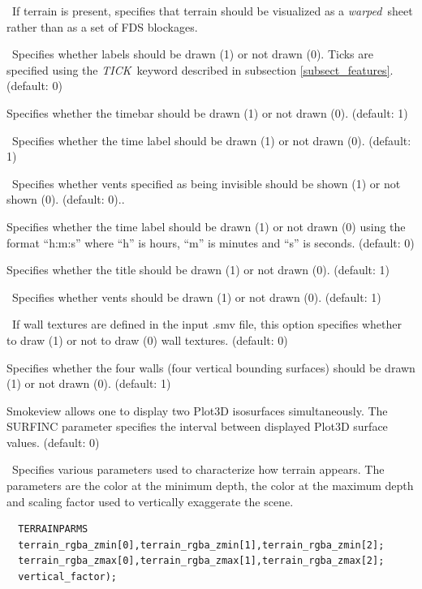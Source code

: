 \documentclass[11pt,twoside]{book}
\begin{document}
\ If terrain is present, specifies that terrain
should be visualized as a {\em warped}\ sheet
rather than as a set of FDS blockages.

\ Specifies whether labels should be drawn (1) or
not drawn (0).  Ticks are specified using the {\em TICK}\ keyword
described in subsection \ref{subsect_features}. (default: 0)

Specifies whether the timebar should be drawn
(1) or not drawn (0). (default: 1)

\ Specifies whether the time label should be
drawn (1) or not drawn (0). (default: 1)

\ Specifies whether vents specified as being invisible should be
shown (1) or not shown (0). (default: 0)..

Specifies whether the time label should be
drawn (1) or not drawn (0) using the format ``h:m:s'' where ``h''
is hours, ``m'' is minutes and ``s'' is seconds.  (default: 0)

Specifies whether
the title should be drawn (1) or not drawn (0).
(default: 1)

\ Specifies whether vents should be drawn
(1) or not drawn (0).  (default: 1)

\ If wall textures are defined in the input .smv file, this
option specifies whether to draw (1) or not to draw (0) wall textures.
(default: 0)


Specifies whether
the four walls (four vertical bounding surfaces) should be drawn (1) or not drawn (0).
(default: 1)

Smokeview allows one to display two Plot3D
isosurfaces simultaneously.  The SURFINC parameter specifies the
interval between displayed Plot3D surface values. (default: 0)

\ Specifies various parameters used to characterize
how terrain appears.  The parameters are the color at the minimum depth,
the color at the maximum depth and scaling factor used to vertically exaggerate
the scene.
\begin{lstlisting}
  TERRAINPARMS
  terrain_rgba_zmin[0],terrain_rgba_zmin[1],terrain_rgba_zmin[2];
  terrain_rgba_zmax[0],terrain_rgba_zmax[1],terrain_rgba_zmax[2];
  vertical_factor);
\end{lstlisting}
\end{document}
